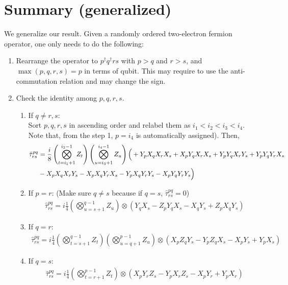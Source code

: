 \documentclass[prb,amsmath,amsfonts,amssymb]{revtex4}
\newcommand{\black}{\color{black}{}}
\begin{document}
\newpage
\section{Summary (generalized)}
We generalize our result. Given a randomly ordered two-electron fermion operator, one only needs to do the following:
\begin{enumerate}
	\item Rearrange the operator to $p^\dag q^\dag r s$ with $p>q$ and $r>s$, and $\max(p,q,r,s) =p$ in terms of qubit. This may require to use the anti-commutation relation and may change the sign.
	\item Check the identity among $p,q,r,s$. 
	\begin{enumerate}
		\item If $q \ne r,s$: \\Sort $p, q,r,s$ in ascending order and relabel them as $i_1<i_2<i_3<i_4$. Note that, from the step 1, $p=i_4$ is automatically assigned). Then,
\begin{align}
		\hat \tau_{rs}^{pq} &= \frac{i }{8} \left(\bigotimes_{t=i_1+1}^{i_2-1} Z_t \right) \left(\bigotimes_{u=i_3+1}^{i_4-1} Z_u \right) 
 \Bigl(
\black +Y_p X_q X_r X_s 
\black  + X_p Y_q X_r X_s
\black + Y_p Y_q X_r  Y_s 
\black+ Y_p Y_q Y_r  X_s \nonumber\\&
\black - X_p X_q X_r Y_s 
\black - X_p X_q Y_r X_s 
\black -Y_p  X_q  Y_r Y_s 
\black- X_p Y_q Y_r Y_s 
\black\Bigr)\label{eq:tpqrs} 
\end{align}
\item If $p = r$:
(Make sure $q \ne s$ because if $q = s$, $\hat \tau_{rs}^{pq} = 0$)
\begin{align}
\hat \tau_{rs}^{pq} =	i \frac{1}{4} \left(\bigotimes_{u=s+1}^{q-1} Z_u\right)  \otimes \left( Y_q X_s - Z_p Y_q X_s - X_q Y_s +Z_p X_q Y_s\right)
\end{align}
\item If $q = r$: 
\begin{align}
	\hat \tau_{rs}^{pq} = i\frac{1}{4} \left(\bigotimes_{t=s+1}^{q-1}Z_t \right)  \left(\bigotimes_{u=q+1}^{p-1}Z_u \right) \otimes ( X_p Z_q Y_s - Y_p Z_q X_s - X_p Y_s  +Y_p X_s)
\end{align}
\item If $q = s$:
\begin{align}
	\hat \tau_{rs}^{pq} = i\frac{1}{4} \left(\bigotimes_{t=r+1}^{p-1}Z_t \right)  \otimes \left(X_p Y_r Z_s -Y_p X_r Z_s -X_p Y_r +Y_p X_r  \right) \end{align}
\end{enumerate}
\end{enumerate}
\end{document}
